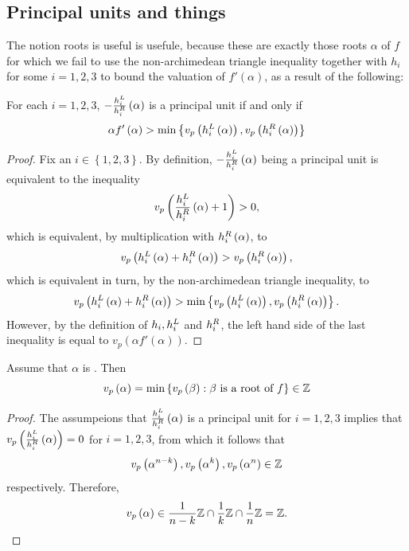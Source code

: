 \documentclass[../main.tex]{subfiles}
\begin{document}
\subsection{Principal units and \ex things}
The notion \ex roots is useful is usefule, because these are exactly those roots $\alpha$ of $f$ for which we fail to use the non-archimedean triangle inequality together with $h_i$ for some $i=1,2,3$ to bound the valuation of $f'\left( \alpha \right)$, as a result of the following:
\begin{lemma}
  \label{lem:principal_unit_criterion}
  For each $i = 1, 2, 3$, 
  $-\frac{h_{i}^L}{h_{i}^R}\left( \alpha \right)$ is a principal unit 
  if and only if
  \[
    \alpha f'\left( \alpha \right) 
    >
    \min\left\{ v_p\left( h_{i}^L\left( \alpha \right) \right), v_p\left( h_{i}^R\left( \alpha \right) \right) \right\} 
\]
\end{lemma}
\begin{proof}
  Fix an $i \in \left\{ 1, 2, 3 \right\}$.
  By definition, $-\frac{h_{i}^L}{h_{i}^R}\left( \alpha \right)$ being a principal unit is equivalent to the inequality 
  \[
    v_p\left( \frac{h_{i}^L}{h_{i}^R}\left( \alpha \right) + 1 \right)
    > 
    0,
  \]
  which is equivalent, by multiplication with $h_{i}^R\left( \alpha \right)$, to
  \[
    v_p\left( h^L_i\left( \alpha \right) + h^R_i\left( \alpha \right) \right)
    > 
    v_p\left( h_{i}^R\left( \alpha \right) \right),
  \]
  which is equivalent in turn, by the non-archimedean triangle inequality, to 
  \[
    v_p\left( h^L_i\left( \alpha \right) + h^R_i\left( \alpha \right) \right)
    > 
    \min\left\{ v_p\left( h_{i}^L\left( \alpha \right) \right), v_p\left( h_{i}^R\left( \alpha \right) \right) \right\}.
  \]
  However, by the definition of $h_{i},h_{i}^L$ and $h_{i}^R$, the left hand side of the last inequality is equal to $v_p\left( \alpha f'\left( \alpha \right) \right)$.
\end{proof}
\begin{lemma}
  Assume that $\alpha$ is \ex.
  Then 
  \[
    v_p\left( \alpha \right) = 
    \min\left\{  
      v_p\left( \beta \right) : \beta \text{ is a root of } f
    \right\} \in \mathbb{Z}
  \]
\end{lemma}
\begin{proof}
  The assumpeions that $\frac{h_{i}^L}{h_{i}^R}\left( \alpha \right)$ is a principal unit for $i = 1,2,3$ implies that $v_p\left( \frac{h_{i}^L}{h_{i}^R}\left( \alpha \right) \right) = 0$ for $i = 1,2,3$, from which it follows that 
  \[
    v_p\left( \alpha^{n-k} \right),
    v_p\left( \alpha^{k} \right),
    v_p\left( \alpha^{n} \right) \in \mathbb{Z}
  \]
  respectively.
  Therefore, 
  \[
    v_p\left( \alpha \right) \in 
    \frac{1}{n-k}\mathbb{Z} \cap \frac{1}{k}\mathbb{Z} \cap \frac{1}{n}\mathbb{Z} = 
    \mathbb{Z}. 
  \]
\end{proof}
\end{document}
